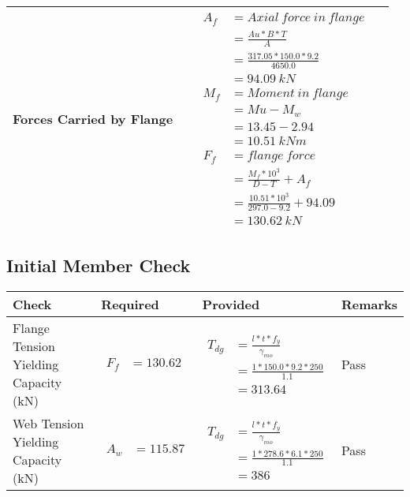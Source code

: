 \documentclass{article}%
\begin{document}
\begin{longtable}{|p{4cm}|p{3.5cm}|p{6.5cm}|p{1.5cm}|}
\hline%
Forces Carried by Flange&&$\begin{aligned} A_f&= Axial~force~ in ~flange  \\ &= \frac{Au * B *T}{A} \\ &= \frac{317.05 * 150.0*9.2}{4650.0} \\ &=94.09~ kN\\ M_f& =Moment~ in~ flange \\  & = Mu-M_w\\ &= 13.45-2.94\\ &=10.51~{kNm}\\  F_f& =flange~force  \\ & = \frac{M_f *10^3}{D-T} + A_f \\ &= \frac{10.51* 10^3}{297.0-9.2} +94.09 \\ &=130.62~kN \end{aligned}$&\\%
\hline%
\end{longtable}

%
\newpage%
\subsection{Initial Member Check}%
\label{subsec:InitialMemberCheck}%
\renewcommand{\arraystretch}{1.2}%
\begin{longtable}{|p{3cm}|p{4.5cm}|p{6.5cm}|p{1.5cm}|}%
\hline%
\rowcolor{OsdagGreen}%
Check&Required&Provided&Remarks\\%
\hline%
\endhead%
\hline%
Flange Tension Yielding Capacity (kN)&$\begin{aligned} F_f &=130.62\end{aligned}$&$\begin{aligned} T_{dg} &= \frac{l*t*f_y}{\gamma_{mo}}\\ &=\frac{1*150.0*9.2*250}{1.1}\\ &=313.64\end{aligned}$&Pass\\%
\hline%
Web Tension Yielding Capacity (kN)&$\begin{aligned} A_w &=115.87\end{aligned}$&$\begin{aligned} T_{dg} &= \frac{l*t*f_y}{\gamma_{mo}}\\ &=\frac{1*278.6*6.1*250}{1.1}\\ &=386\end{aligned}$&Pass\\%
\hline%
\end{longtable}
\end{document}
